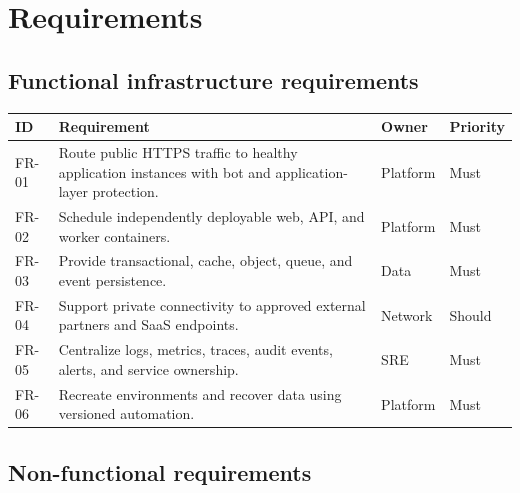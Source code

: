 \section{Requirements}

\subsection{Functional infrastructure requirements}

\begin{tabularx}{\textwidth}{@{}C{14mm}Y L{28mm} C{18mm}@{}}
  \toprule
  \color{white}\textbf{ID} & \color{white}\textbf{Requirement} & \color{white}\textbf{Owner} & \color{white}\textbf{Priority} \\
  \midrule
  FR-01 & Route public HTTPS traffic to healthy application instances with bot and application-layer protection. & Platform & Must \\
  FR-02 & Schedule independently deployable web, API, and worker containers. & Platform & Must \\
  FR-03 & Provide transactional, cache, object, queue, and event persistence. & Data & Must \\
  FR-04 & Support private connectivity to approved external partners and SaaS endpoints. & Network & Should \\
  FR-05 & Centralize logs, metrics, traces, audit events, alerts, and service ownership. & SRE & Must \\
  FR-06 & Recreate environments and recover data using versioned automation. & Platform & Must \\
  \bottomrule
\end{tabularx}

\subsection{Non-functional requirements}

